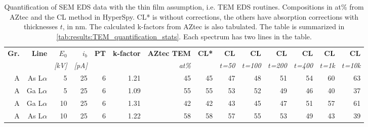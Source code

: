 \begin{table}[phtb]
    \begin{center}
        \caption{
            Quantification of SEM EDS data with the thin film assumption, i.e. TEM EDS routines.
            Compositions in at\% from AZtec and the CL method in HyperSpy. CL* is without corrections, the others have absorption corrections with thicknesses $t$, in nm.
            The calculated k-factors from AZtec is also tabulated. 
            The table is summarized in \cref{tab:results:TEM_quantification_stats}.
            Each spectrum has two lines in the table.
        }
        \label{tab:results:TEM_quantification}
        \begin{tabular}{rrrrrrrrrrrrrr}
            \hline
            \textbf{Gr.} & \textbf{Line} & \textbf{$E_0$} & \textbf{$i_b$} & \textbf{PT} & \textbf{k-factor} & \textbf{AZtec TEM} & \textbf{CL*} & \textbf{CL}   & \textbf{CL}    & \textbf{CL}    & \textbf{CL}    & \textbf{CL}   & \textbf{CL}    \\
            \emph{}      & \emph{}       & \emph{[kV]}    & \emph{[pA]}    & \emph{}     & \emph{}           & \emph{at\%}    & \emph{}      & \emph{$t$=50} & \emph{$t$=100} & \emph{$t$=200} & \emph{$t$=400} & \emph{$t$=1k} & \emph{$t$=10k} \\
            \hline
            A            & As L$\alpha$  & 5              & 25             & 6           & 1.21              & 45             & 45           & 47            & 48             & 51             & 54             & 60            & 63             \\
            A            & Ga L$\alpha$  & 5              & 25             & 6           & 1.09              & 55             & 55           & 53            & 52             & 49             & 46             & 40            & 37             \\
            A            & Ga L$\alpha$  & 10             & 25             & 6           & 1.31              & 42             & 42           & 43            & 45             & 47             & 51             & 57            & 61             \\
            A            & As L$\alpha$  & 10             & 25             & 6           & 1.22              & 58             & 58           & 57            & 55             & 53             & 49             & 43            & 39             \\

\end{tabular}
\end{center}
\end{table}
